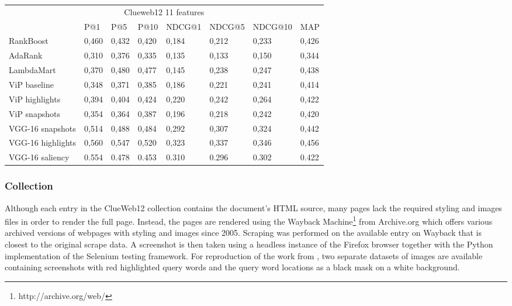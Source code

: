 \begin{table}[t]
\begin{center}
\begin{tabular}{llllllll}
\multicolumn{8}{c}{Clueweb12 11 features}                                    \\ 
                      & P@1   & P@5   & P@10  & NDCG@1 & NDCG@5 & NDCG@10 & MAP   \\ \hline
RankBoost             & 0,460 & 0,432 & 0,420 & 0,184  & 0,212  & 0,233   & 0,426 \\
AdaRank               & 0,310 & 0,376 & 0,335 & 0,135  & 0,133  & 0,150   & 0,344 \\
LambdaMart            & 0,370 & 0,480 & 0,477 & 0,145  & 0,238  & 0,247   & 0,438 \\ \hline
ViP baseline          & 0,348 & 0,371 & 0,385 & 0,186  & 0,221  & 0,241   & 0,414 \\ \hline
ViP highlights        & 0,394 & 0,404 & 0,424 & 0,220  & 0,242  & 0,264   & 0,422 \\
ViP snapshots         & 0,354 & 0,364 & 0,387 & 0,196  & 0,218  & 0,242   & 0,420 \\ \hline
VGG-16 snapshots      & 0,514 & 0,488 & 0,484 & 0,292  & 0,307  & 0,324   & 0,442 \\ 
VGG-16 highlights     & 0,560 & 0,547 & 0,520 & 0,323  & 0,337  & 0,346   & 0,456 \\ \hline
VGG-16 saliency       & 0.554 & 0.478 & 0.453 & 0.310  & 0.296  & 0.302   & 0.422 \\
\end{tabular}
\centering
{}
\label{tab:results}
\end{center}
\end{table}


\subsubsection{Collection}
Although each entry in the ClueWeb12 collection contains the document's HTML source, many pages lack the required styling and images files in order to render the full page. Instead, the pages are rendered using the Wayback Machine\footnote{http://archive.org/web/} from Archive.org which offers various archived versions of webpages with styling and images since 2005. Scraping was performed on the available entry on Wayback that is closest to the original scrape data. A screenshot is then taken using a headless instance of the Firefox browser together with the Python implementation of the Selenium testing framework. 
For reproduction of the work from \citet{fan2017learning}, two separate datasets of images are available containing screenshots with red highlighted query words and the query word locations as a black mask on a white background. 

